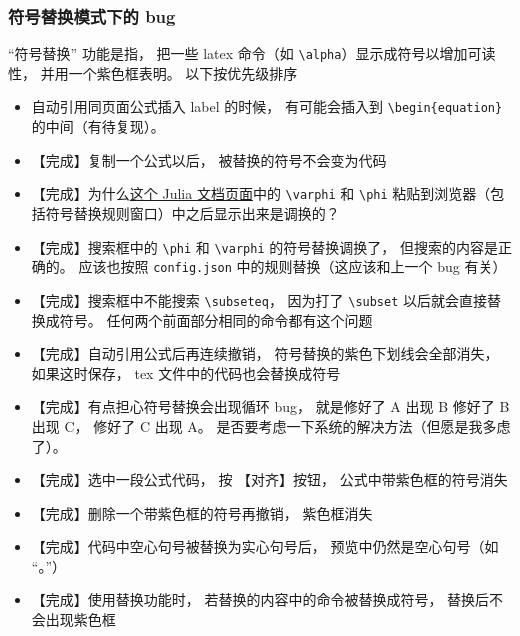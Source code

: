 \subsubsection{符号替换模式下的 bug}
“符号替换” 功能是指， 把一些 latex 命令（如 \verb|\alpha|）显示成符号以增加可读性， 并用一个紫色框表明。 以下按优先级排序
\begin{itemize}
\item 自动引用同页面公式插入 label 的时候， 有可能会插入到 \verb|\begin{equation}| 的中间（有待复现）。

\item 【完成】复制一个公式以后， 被替换的符号不会变为代码

\item 【完成】为什么\href{https://docs.julialang.org/en/v1/manual/unicode-input/}{这个 Julia 文档页面}中的 \lstinline|\varphi| 和 \lstinline|\phi| 粘贴到浏览器（包括符号替换规则窗口）中之后显示出来是调换的？

\item 【完成】搜索框中的 \lstinline|\phi| 和 \lstinline|\varphi| 的符号替换调换了， 但搜索的内容是正确的。 应该也按照 \lstinline|config.json| 中的规则替换（这应该和上一个 bug 有关）

\item 【完成】搜索框中不能搜索 \lstinline|\subseteq|， 因为打了 \lstinline|\subset| 以后就会直接替换成符号。 任何两个前面部分相同的命令都有这个问题

\item 【完成】自动引用公式后再连续撤销， 符号替换的紫色下划线会全部消失， 如果这时保存， tex 文件中的代码也会替换成符号

\item 【完成】有点担心符号替换会出现循环 bug， 就是修好了 A 出现 B 修好了 B 出现 C， 修好了 C 出现 A。 是否要考虑一下系统的解决方法（但愿是我多虑了）。

\item 【完成】选中一段公式代码， 按 【对齐】按钮， 公式中带紫色框的符号消失

\item 【完成】删除一个带紫色框的符号再撤销， 紫色框消失

\item 【完成】代码中空心句号被替换为实心句号后， 预览中仍然是空心句号（如 “。”）

\item 【完成】使用替换功能时， 若替换的内容中的命令被替换成符号， 替换后不会出现紫色框
\end{itemize}

